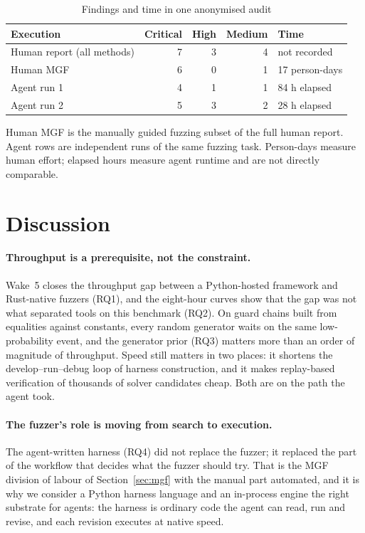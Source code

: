 \documentclass[11pt,a4paper]{article}
\newcommand{\wake}{Wake}
\newcommand{\tablenote}[1]{\par\smallskip\begin{minipage}{\linewidth}\footnotesize\raggedright #1\end{minipage}}
\begin{document}
\begin{table}[t]
\centering\small
\caption{Findings and time in one anonymised audit}
\label{tab:audit}
\begin{tabular}{@{}lrrrl@{}}
\toprule
Execution & Critical & High & Medium & Time \\
\midrule
Human report (all methods) & 7 & 3 & 4 & not recorded \\
Human MGF & 6 & 0 & 1 & 17 person-days \\
Agent run 1 & 4 & 1 & 1 & 84 h elapsed \\
Agent run 2 & 5 & 3 & 2 & 28 h elapsed \\
\bottomrule
\end{tabular}
\tablenote{Human MGF is the manually guided fuzzing subset of the full human report. Agent rows are independent runs of the same fuzzing task. Person-days measure human effort; elapsed hours measure agent runtime and are not directly comparable.}
\end{table}

\section{Discussion}
\label{sec:discussion}

\paragraph{Throughput is a prerequisite, not the constraint.}
\wake{}~5 closes the throughput gap between a Python-hosted framework and Rust-native fuzzers (RQ1), and the eight-hour curves show that the gap was not what separated tools on this benchmark (RQ2). On guard chains built from equalities against constants, every random generator waits on the same low-probability event, and the generator prior (RQ3) matters more than an order of magnitude of throughput. Speed still matters in two places: it shortens the develop--run--debug loop of harness construction, and it makes replay-based verification of thousands of solver candidates cheap. Both are on the path the agent took.

\paragraph{The fuzzer's role is moving from search to execution.}
The agent-written harness (RQ4) did not replace the fuzzer; it replaced the part of the workflow that decides what the fuzzer should try. That is the MGF division of labour of Section~\ref{sec:mgf} with the manual part automated, and it is why we consider a Python harness language and an in-process engine the right substrate for agents: the harness is ordinary code the agent can read, run and revise, and each revision executes at native speed.
\end{document}
